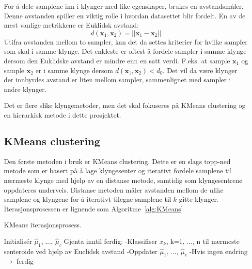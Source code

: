 \documentclass[twocolumn,norwegian]{article}
\begin{document}
	For å dele samplene inn i klynger med like egenskaper, brukes en avstandsmåler.
	Denne avstanden spiller en viktig rolle i hvordan datasettet blir fordelt. En av de mest vanlige metrikkene er Euklidsk avstand:
	\begin{equation}
		\label{eq:Euclidsk avstand}
		d(\textbf{x}_1, \textbf{x}_2) = ||\textbf{x}_1 - \textbf{x}_2||
	\end{equation}
	Utifra avstanden mellom to sampler, kan det da settes kriterier for hvilke sampler som skal i samme klynge. Det enkleste er oftest å fordele sampler i samme klynge dersom den Euklidske avstand er mindre enn en satt verdi. F.eks. at sample $\textbf{x}_1$ og sample $\textbf{x}_2$ er i samme klynge dersom $d(\textbf{x}_1, \textbf{x}_2)<d_0$. Det vil da være klynger der innbyrdes avstand er liten mellom sampler, sammenlignet med sampler i andre klynger. 
	
	Det er flere slike klyngemetoder, men det skal fokuseres på KMeans clustering og en hierarkisk metode i dette prosjektet.
	
	
	\subsection{KMeans clustering}
	Den første metoden i bruk er KMeans clustering. Dette er en slags topp-ned metode som er basert på å lage klyngesenter og iterativt fordele samplene til nærmeste klynge med hjelp av en distanse metode, samtidig som klyngesentrene oppdateres underveis. Distanse metoden måler avstanden mellom de ulike samplene og klyngene for å iterativt tilegne samplene til $k$ gitte klynger. Iterasjonsprosessen er lignende som Algoritme~\ref{alg:KMeans}.
	\begin{algorithm}
		\caption{KMeans iterasjonsprosess.}
		\label{alg:KMeans}
		\begin{algorithmic}
			\STATE *Initialisér $\hat{\mu}_1$, ..., $\hat{\mu}_c$
			\STATE *Gjenta inntil ferdig:
				\STATE \quad -Klassifiser $x_k$, k=1, ..., n til nærmeste senteroide ved hjelp av Euclidsk avstand
				\STATE \quad -Oppdater $\hat{\mu}_1$, ..., $\hat{\mu}_c$
				\STATE \quad -Hvis ingen endring $\rightarrow$ ferdig
		\end{algorithmic}
	\end{algorithm}
	
\end{document}
